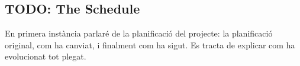  
\subsection{TODO: The Schedule}

En primera instància parlaré de la planificació del projecte: la planificació
original, com ha canviat, i finalment com ha sigut. Es tracta de explicar com
ha evolucionat tot plegat.

